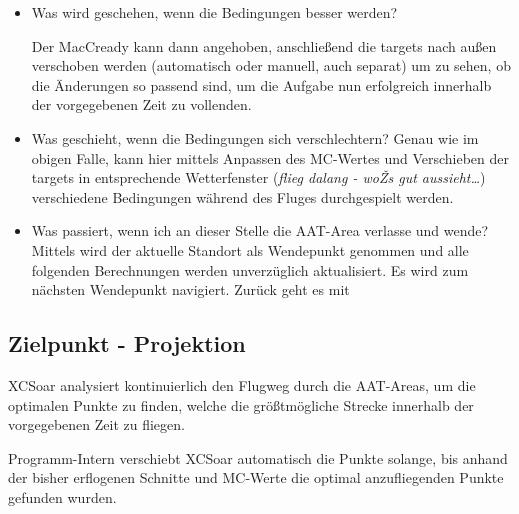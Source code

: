 \begin{itemize}
\item Was wird geschehen, wenn die Bedingungen besser werden?

Der MacCready kann dann angehoben, anschließend die targets nach außen verschoben werden (automatisch oder manuell, auch separat) um zu sehen, ob die Änderungen so passend sind, um die Aufgabe nun erfolgreich innerhalb der vorgegebenen Zeit zu vollenden.
\item Was geschieht, wenn die Bedingungen sich verschlechtern? Genau wie im obigen Falle, kann hier mittels Anpassen des MC-Wertes und Verschieben der targets in entsprechende Wetterfenster (\textsl{flieg dalang - woŽs gut aussieht\dots}) verschiedene Bedingungen während des Fluges durchgespielt werden.
\item Was passiert, wenn ich an dieser Stelle die AAT-Area verlasse und wende?
Mittels  \blink{}  wird der aktuelle Standort als Wendepunkt genommen und alle folgenden Berechnungen werden  unverzüglich aktualisiert. Es wird zum nächsten Wendepunkt navigiert. Zurück geht es mit \blink{}
\end{itemize}

\subsection*{Zielpunkt - Projektion}

\textsf{XCSoar} analysiert kontinuierlich den Flugweg durch die AAT-Areas, um  die optimalen Punkte zu finden, welche die größtmögliche Strecke innerhalb der vorgegebenen Zeit zu fliegen.

Programm-Intern verschiebt  \textsf{XCSoar} automatisch die Punkte solange, bis anhand der bisher erflogenen Schnitte und MC-Werte die optimal anzufliegenden Punkte gefunden wurden.

